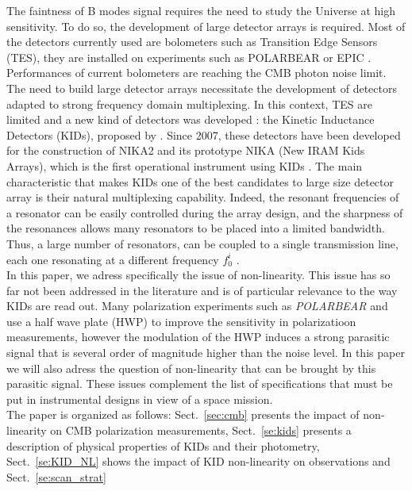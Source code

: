 The faintness of B modes signal requires the need to study the Universe at high sensitivity. To do so, the development of large detector arrays is required. Most of the detectors currently used are bolometers such as Transition Edge Sensors (TES), they are installed on experiments such as POLARBEAR \citep{2014ApJ...794..171P} or EPIC \citep{2008arXiv0805.4207B}. Performances of current bolometers are reaching the CMB photon noise limit. The need to build large detector arrays necessitate the development of detectors adapted to strong frequency domain multiplexing. In this context, TES are limited and a new kind of detectors was developed : the Kinetic Inductance Detectors (KIDs), proposed by \citet{2003Natur.425..817D}. Since 2007, these detectors have been developed for the construction of NIKA2 and its prototype NIKA (New IRAM Kids Arrays), which is the first operational instrument using KIDs \citep{2010A&A...521A..29M,2016JLTP..184..816C}. The main characteristic that makes KIDs one of the best candidates to large size detector array is their natural multiplexing capability. Indeed, the resonant frequencies of a resonator can be easily controlled during the array design, and the sharpness of the resonances allows many resonators to be placed into a limited bandwidth. Thus, a large number of resonators, can be coupled to a single transmission line, each one resonating at a different frequency $f_{0}^{i}$ \citep{2010A&A...521A..29M,Calvo2008}.\\
In this paper, we adress specifically the issue of non-linearity. This issue has so far not been addressed in the literature and is of particular relevance to the way KIDs are read out. Many polarization experiments such as  \emph{POLARBEAR} \citep{2017JCAP...05..008T} and  \citep{2017A&A...599A..34R} use a half wave plate (HWP) to improve the sensitivity in polarizatioon measurements, however the modulation of the HWP induces a strong parasitic signal that is several order of magnitude higher than the noise level. In this paper we will also adress the question of non-linearity that can be brought by this parasitic signal. These issues complement the list of specifications that must be put in instrumental designs in view of a space mission.\\
The paper is organized as follows: Sect.~\ref{sec:cmb} presents the impact of non-linearity on CMB polarization measurements, Sect.~\ref{se:kids} presents a description of physical properties of KIDs and their photometry, Sect.~\ref{se:KID_NL} shows the impact of KID non-linearity on observations and Sect.~\ref{se:scan_strat}
